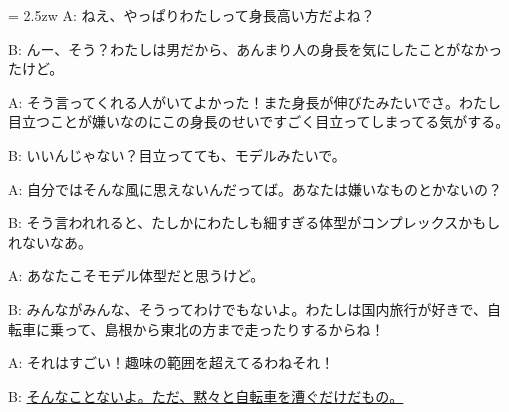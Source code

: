 \documentclass[11pt]{amsart}
\title{}
\author{}
\newenvironment{hangall}[1]{\hangindent = 2.5zw\everypar{\hangindent = 2.5zw}}{}
\begin{document}
\maketitle
\begin{hangall}{}%
A: ねえ、やっぱりわたしって身長高い方だよね？

B: んー、そう？わたしは男だから、あんまり人の身長を気にしたことがなかったけど。

A: そう言ってくれる人がいてよかった！また身長が伸びたみたいでさ。わたし目立つことが嫌いなのにこの身長のせいですごく目立ってしまってる気がする。

B: いいんじゃない？目立ってても、モデルみたいで。

A: 自分ではそんな風に思えないんだってば。あなたは嫌いなものとかないの？

B: そう言われれると、たしかにわたしも細すぎる体型がコンプレックスかもしれないなあ。

A: あなたこそモデル体型だと思うけど。

B: みんながみんな、そうってわけでもないよ。わたしは国内旅行が好きで、自転車に乗って、島根から東北の方まで走ったりするからね！

A: それはすごい！趣味の範囲を超えてるわねそれ！

B: \ul{そんなことないよ。ただ、黙々と自転車を漕ぐだけだもの。}\end{hangall}
\end{document}
